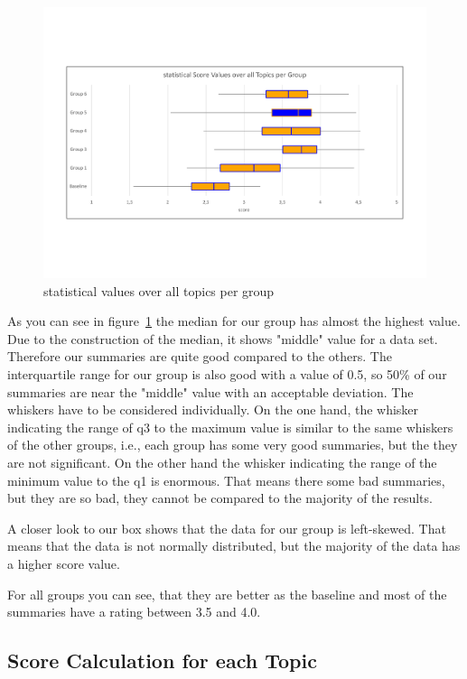 \begin{figure}[H]
	\centering
	\includegraphics[trim=0 150 0 150, width=\textwidth]{img/box.pdf}
	\caption{statistical values over all topics per group}
	\label{fig:box}
\end{figure}

As you can see in figure~\ref{fig:box} the median for our group has almost the highest value. Due to the construction of the median, it shows "middle" value for a data set. Therefore our summaries are quite good compared to the others.
The interquartile range for our group is also good with a value of 0.5, so 50\% of our summaries are near the "middle" value with an acceptable deviation.
The whiskers have to be considered individually.
On the one hand, the whisker indicating the range of q3 to the maximum value is similar to the same whiskers of the other groups, i.e., each group has some very good summaries, but the they are not significant.
On the other hand the whisker indicating the range of the minimum value to the q1 is enormous.
That means there some bad summaries, but they are so bad, they cannot be compared to the majority of the results.

A closer look to our box shows that the data for our group is left-skewed.
That means that the data is not normally distributed, but the majority of the data has a higher score value.

For all groups you can see, that they are better as the baseline and most of the summaries have a rating between 3.5 and 4.0.

\subsection{Score Calculation for each Topic}

